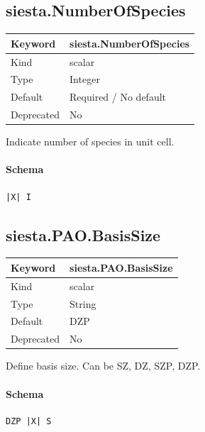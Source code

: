 \documentclass[11pt]{article}
\begin{document}
{{{{{\subsection{siesta.NumberOfSpecies}
\label{kw:siesta-NumberOfSpecies}
\begin{longtable}{|p{1.5in}|p{4.5in}|}
\hline
Keyword & siesta.NumberOfSpecies \\
\hline
Kind & scalar \\
\hline
Type & Integer \\
\hline
Default & Required / No default \\
\hline
Deprecated & No \\
\hline
\end{longtable}
 Indicate number of species in unit cell.

\paragraph{Schema}
\begin{Verbatim}
|X| I
\end{Verbatim}

\subsection{siesta.PAO.BasisSize}
\label{kw:siesta-PAO-BasisSize}
\begin{longtable}{|p{1.5in}|p{4.5in}|}
\hline
Keyword & siesta.PAO.BasisSize \\
\hline
Kind & scalar \\
\hline
Type & String \\
\hline
Default & DZP \\
\hline
Deprecated & No \\
\hline
\end{longtable}
 Define basis size. Can be SZ, DZ, SZP, DZP.

\paragraph{Schema}
\begin{Verbatim}
DZP |X| S
\end{Verbatim}

}}}}}
\end{document}
